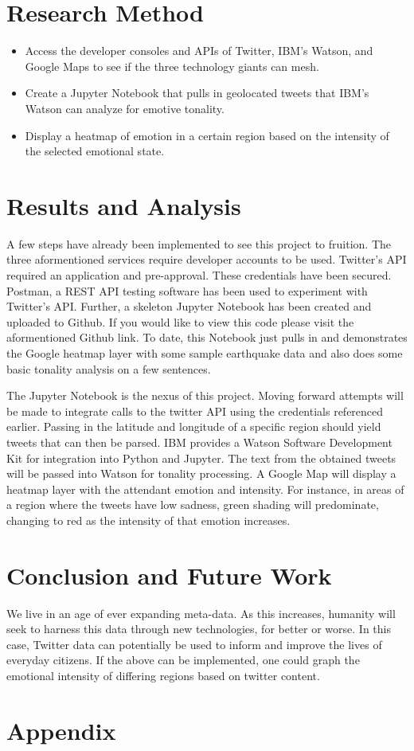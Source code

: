 \documentclass[12pt, oneside]{article}
\begin{document}
\section{Research Method}
\begin{itemize}
 \item Access the developer consoles and APIs of Twitter, IBM's Watson, and Google Maps to see if the three technology giants can mesh.

 \item Create a Jupyter Notebook that pulls in geolocated tweets that IBM's
 Watson can analyze for emotive tonality.

 \item Display a heatmap of emotion in a certain region based on the intensity
 of the selected emotional state.

\end{itemize}

\section{Results and Analysis}
A few steps have already been implemented to see this project to fruition. The
three aformentioned services require developer accounts to be used.
Twitter's API required an application and pre-approval. These credentials have
been secured. Postman, a REST API testing software has been used to experiment
with Twitter's API\cite{Postman}. Further, a skeleton Jupyter Notebook has
been created and uploaded to Github\cite{Git}. If you would like to view this code please visit the aformentioned Github link. To date, this Notebook just
pulls in and demonstrates the Google heatmap layer with some sample earthquake
data and also does some basic tonality analysis on a few sentences.


The Jupyter Notebook is the nexus of this project. Moving forward attempts will
be made to integrate calls to the twitter API using the credentials referenced
earlier. Passing in the latitude and longitude of a specific region should
yield tweets that can then be parsed. IBM provides a Watson Software
Development Kit for integration into Python and Jupyter. The text from the
obtained tweets will be passed into Watson for tonality processing. A Google
Map will display a heatmap layer with the attendant emotion and intensity. For
instance, in areas of a region where the tweets have low sadness, green shading
will predominate, changing to red as the intensity of that emotion increases.

\section{Conclusion and Future Work}
We live in an age of ever expanding meta-data. As this increases, humanity will
seek to harness this data through new technologies, for better or worse. In
this case, Twitter data can potentially be used to inform and improve the lives
of everyday citizens. If the above can be implemented, one could graph
the emotional intensity of differing regions based on twitter content.

\newpage{}


%


\newpage{}
\section{Appendix}
\end{document}
